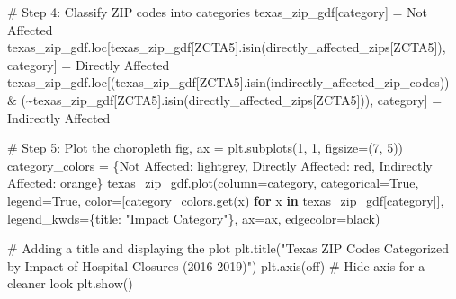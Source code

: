 \documentclass[
  letterpaper,
  DIV=11,
  numbers=noendperiod]{scrartcl}
\newenvironment{Shaded}{\begin{snugshade}}{\end{snugshade}}
\newcommand{\CommentTok}[1]{\textcolor[rgb]{0.37,0.37,0.37}{#1}}
\newcommand{\ControlFlowTok}[1]{\textcolor[rgb]{0.00,0.23,0.31}{\textbf{#1}}}
\newcommand{\DecValTok}[1]{\textcolor[rgb]{0.68,0.00,0.00}{#1}}
\newcommand{\KeywordTok}[1]{\textcolor[rgb]{0.00,0.23,0.31}{\textbf{#1}}}
\newcommand{\NormalTok}[1]{\textcolor[rgb]{0.00,0.23,0.31}{#1}}
\newcommand{\OperatorTok}[1]{\textcolor[rgb]{0.37,0.37,0.37}{#1}}
\newcommand{\StringTok}[1]{\textcolor[rgb]{0.13,0.47,0.30}{#1}}
\newcommand{\VariableTok}[1]{\textcolor[rgb]{0.07,0.07,0.07}{#1}}
\begin{document}
\begin{Shaded}
\begin{Highlighting}[]
\CommentTok{\# Step 4: Classify ZIP codes into categories}
\NormalTok{texas\_zip\_gdf[}\StringTok{\textquotesingle{}category\textquotesingle{}}\NormalTok{] }\OperatorTok{=} \StringTok{\textquotesingle{}Not Affected\textquotesingle{}}
\NormalTok{texas\_zip\_gdf.loc[texas\_zip\_gdf[}\StringTok{\textquotesingle{}ZCTA5\textquotesingle{}}\NormalTok{].isin(directly\_affected\_zips[}\StringTok{\textquotesingle{}ZCTA5\textquotesingle{}}\NormalTok{]), }\StringTok{\textquotesingle{}category\textquotesingle{}}\NormalTok{] }\OperatorTok{=} \StringTok{\textquotesingle{}Directly Affected\textquotesingle{}}
\NormalTok{texas\_zip\_gdf.loc[(texas\_zip\_gdf[}\StringTok{\textquotesingle{}ZCTA5\textquotesingle{}}\NormalTok{].isin(indirectly\_affected\_zip\_codes)) }\OperatorTok{\&} 
\NormalTok{                  (}\OperatorTok{\textasciitilde{}}\NormalTok{texas\_zip\_gdf[}\StringTok{\textquotesingle{}ZCTA5\textquotesingle{}}\NormalTok{].isin(directly\_affected\_zips[}\StringTok{\textquotesingle{}ZCTA5\textquotesingle{}}\NormalTok{])), }\StringTok{\textquotesingle{}category\textquotesingle{}}\NormalTok{] }\OperatorTok{=} \StringTok{\textquotesingle{}Indirectly Affected\textquotesingle{}}

\CommentTok{\# Step 5: Plot the choropleth}
\NormalTok{fig, ax }\OperatorTok{=}\NormalTok{ plt.subplots(}\DecValTok{1}\NormalTok{, }\DecValTok{1}\NormalTok{, figsize}\OperatorTok{=}\NormalTok{(}\DecValTok{7}\NormalTok{, }\DecValTok{5}\NormalTok{))}
\NormalTok{category\_colors }\OperatorTok{=}\NormalTok{ \{}\StringTok{\textquotesingle{}Not Affected\textquotesingle{}}\NormalTok{: }\StringTok{\textquotesingle{}lightgrey\textquotesingle{}}\NormalTok{, }\StringTok{\textquotesingle{}Directly Affected\textquotesingle{}}\NormalTok{: }\StringTok{\textquotesingle{}red\textquotesingle{}}\NormalTok{, }\StringTok{\textquotesingle{}Indirectly Affected\textquotesingle{}}\NormalTok{: }\StringTok{\textquotesingle{}orange\textquotesingle{}}\NormalTok{\}}
\NormalTok{texas\_zip\_gdf.plot(column}\OperatorTok{=}\StringTok{\textquotesingle{}category\textquotesingle{}}\NormalTok{, categorical}\OperatorTok{=}\VariableTok{True}\NormalTok{, }
\NormalTok{                   legend}\OperatorTok{=}\VariableTok{True}\NormalTok{, color}\OperatorTok{=}\NormalTok{[category\_colors.get(x) }\ControlFlowTok{for}\NormalTok{ x }\KeywordTok{in}\NormalTok{ texas\_zip\_gdf[}\StringTok{\textquotesingle{}category\textquotesingle{}}\NormalTok{]],}
\NormalTok{                   legend\_kwds}\OperatorTok{=}\NormalTok{\{}\StringTok{\textquotesingle{}title\textquotesingle{}}\NormalTok{: }\StringTok{"Impact Category"}\NormalTok{\}, ax}\OperatorTok{=}\NormalTok{ax, edgecolor}\OperatorTok{=}\StringTok{\textquotesingle{}black\textquotesingle{}}\NormalTok{)}

\CommentTok{\# Adding a title and displaying the plot}
\NormalTok{plt.title(}\StringTok{"Texas ZIP Codes Categorized by Impact of Hospital Closures (2016{-}2019)"}\NormalTok{)}
\NormalTok{plt.axis(}\StringTok{\textquotesingle{}off\textquotesingle{}}\NormalTok{)  }\CommentTok{\# Hide axis for a cleaner look}
\NormalTok{plt.show()}
\end{Highlighting}
\end{Shaded}
\end{document}
